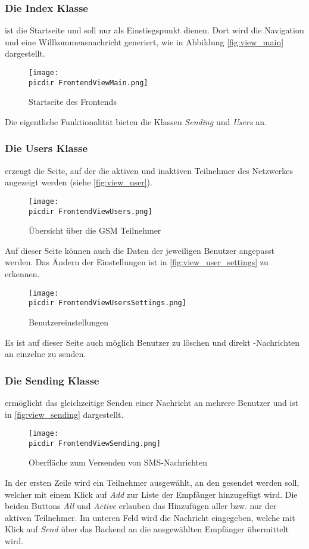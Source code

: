 \FloatBarrier
\subsubsection*{Die Index Klasse} ist die Startseite und soll nur als Einstiegspunkt dienen. Dort wird die Navigation und eine Willkommensnachricht generiert, wie in Abbildung \autoref{fig:view_main} dargestellt.
\begin{figure}[h]
	\centering
	\texttt{[image: \\picdir FrontendViewMain.png]}
	\caption{Startseite des Frontends}
	\label{fig:view_main}
\end{figure}
Die eigentliche Funktionalität bieten die Klassen \emph{Sending} und \emph{Users} an. 

\FloatBarrier
\subsubsection*{Die Users Klasse} erzeugt die Seite, auf der die aktiven und inaktiven Teilnehmer des Netzwerkes angezeigt werden (siehe \autoref{fig:view_user}). 
\begin{figure}[h]
	\centering
	\texttt{[image: \\picdir FrontendViewUsers.png]}
	\caption{Übersicht über die GSM Teilnehmer}
	\label{fig:view_user}
\end{figure}
Auf dieser Seite können auch die Daten der jeweiligen Benutzer angepasst werden. Das Ändern der Einstellungen ist in \autoref{fig:view_user_settings} zu erkennen.
\begin{figure}[h]
	\centering
	\texttt{[image: \\picdir FrontendViewUsersSettings.png]}
	\caption{Benutzereinstellungen}
	\label{fig:view_user_settings}
\end{figure}
Es ist auf dieser Seite auch möglich Benutzer zu löschen und direkt \SMS-Nachrichten an einzelne zu senden.

\FloatBarrier
\subsubsection*{Die Sending Klasse}
ermöglicht das gleichzeitige Senden einer Nachricht an mehrere Benutzer und ist in \autoref{fig:view_sending} dargestellt.
\begin{figure}[h!]
	\centering
	\texttt{[image: \\picdir FrontendViewSending.png]}
	\caption{Oberfläche zum Versenden von \acs*{SMS}-Nachrichten}
	\label{fig:view_sending}
\end{figure}
In der ersten Zeile wird ein Teilnehmer ausgewählt, an den gesendet werden soll, welcher mit einem Klick auf \emph{Add} zur Liste der Empfänger hinzugefügt wird. Die beiden Buttons \emph{All} und \emph{Active} erlauben das Hinzufügen aller bzw. nur der aktiven Teilnehmer. Im unteren Feld wird die Nachricht eingegeben, welche mit Klick auf \emph{Send} über das Backend an die ausgewählten Empfänger übermittelt wird.

